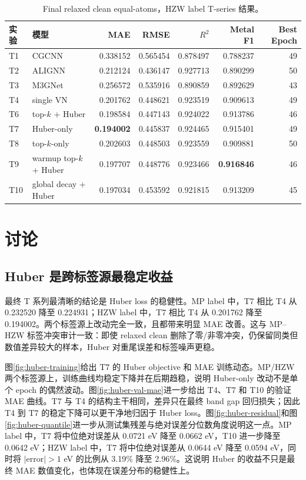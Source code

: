 \documentclass[UTF8,a4paper,11pt]{ctexart}
\newcommand{\rdsq}{R^2}
\begin{document}
\begin{table}[htbp]
\centering
\caption{Final relaxed clean equal-atoms，HZW label T-series 结果。}
\label{tab:t-hzw}
\small
\begin{tabular}{l l r r r r r}
\toprule
实验 & 模型 & MAE & RMSE & $\rdsq$ & Metal F1 & Best Epoch \\
\midrule
T1 & CGCNN & 0.338152 & 0.565454 & 0.878497 & 0.788237 & 49 \\
T2 & ALIGNN & 0.212124 & 0.436147 & 0.927713 & 0.890299 & 50 \\
T3 & M3GNet & 0.256572 & 0.535916 & 0.890859 & 0.892629 & 43 \\
T4 & single VN & 0.201762 & 0.448621 & 0.923519 & 0.909613 & 49 \\
T6 & top-$k$ + Huber & 0.198584 & 0.447143 & 0.924022 & 0.913786 & 46 \\
T7 & Huber-only & \textbf{0.194002} & 0.445837 & 0.924465 & 0.915401 & 49 \\
T8 & top-$k$-only & 0.202603 & 0.448503 & 0.923559 & 0.909881 & 50 \\
T9 & warmup top-$k$ + Huber & 0.197707 & 0.448776 & 0.923466 & \textbf{0.916846} & 46 \\
T10 & global decay + Huber & 0.197034 & 0.453592 & 0.921815 & 0.913209 & 45 \\
\bottomrule
\end{tabular}
\end{table}

\section{讨论}

\subsection{Huber 是跨标签源最稳定收益}

最终 T 系列最清晰的结论是 Huber loss 的稳健性。MP label 中，T7 相比 T4 从 0.232520 降至 0.224931；HZW label 中，T7 相比 T4 从 0.201762 降至 0.194002。两个标签源上改动完全一致，且都带来明显 MAE 改善。这与 MP--HZW 标签冲突审计一致：即使 relaxed clean 删除了零/非零冲突，仍保留同类但数值差异较大的样本，Huber 对重尾误差和标签噪声更稳。

图\ref{fig:huber-training}给出 T7 的 Huber objective 和 MAE 训练动态。MP/HZW 两个标签源上，训练曲线均稳定下降并在后期趋稳，说明 Huber-only 改动不是单个 epoch 的偶然波动。图\ref{fig:huber-val-mae}进一步给出 T4、T7 和 T10 的验证 MAE 曲线。T7 与 T4 的结构主干相同，差异只在最终 band gap 回归损失；因此 T4 到 T7 的稳定下降可以更干净地归因于 Huber loss。图\ref{fig:huber-residual}和图\ref{fig:huber-quantile}进一步从测试集残差与绝对误差分位数角度说明这一点。MP label 中，T7 将中位绝对误差从 0.0721 eV 降至 0.0662 eV，T10 进一步降至 0.0642 eV；HZW label 中，T7 将中位绝对误差从 0.0644 eV 降至 0.0594 eV，同时将 $|\mathrm{error}|>1$ eV 的比例从 3.19\% 降至 2.96\%。这说明 Huber 的收益不只是最终 MAE 数值变化，也体现在误差分布的稳健性上。
\end{document}
